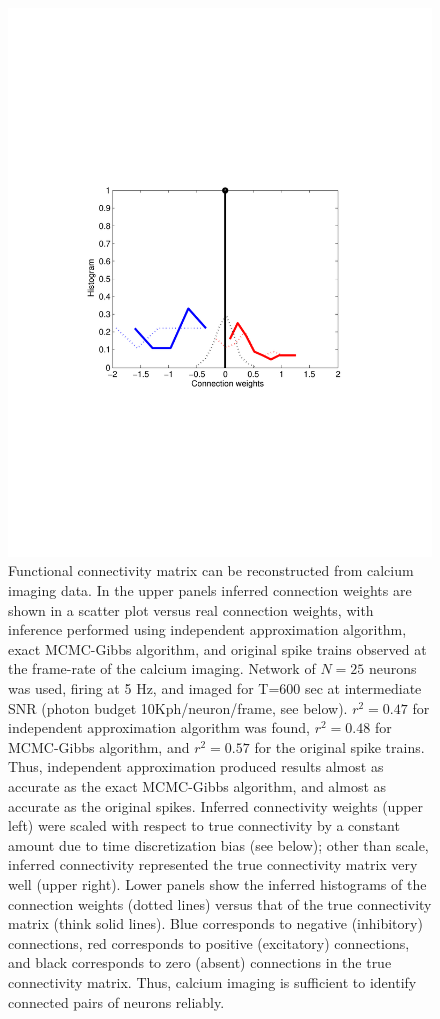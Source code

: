 \begin{figure}[h]
\begin{minipage}[c]{0.3\hsize}
\includegraphics[width=\hsize]{../figs/FigureA3_hist_orig}
\end{minipage}
\caption{Functional connectivity matrix can be reconstructed from calcium imaging data.
In the upper panels inferred connection weights are shown in a scatter plot versus real connection weights, with inference performed using independent approximation algorithm, exact MCMC-Gibbs algorithm, and original spike trains observed at the frame-rate of the calcium imaging. Network of $N=25$ neurons was used, firing at 5 Hz, and imaged for T=600 sec at intermediate SNR (photon budget 10Kph/neuron/frame, see below).
$r^2=0.47$ for independent approximation algorithm was found, $r^2=0.48$ for MCMC-Gibbs algorithm, and $r^2=0.57$ for the original spike trains. 
Thus, independent approximation produced results almost as accurate as the exact MCMC-Gibbs algorithm, and almost as accurate as the original spikes.
Inferred connectivity weights (upper left) were scaled with respect to true connectivity by a constant amount due to time discretization bias (see below); other than scale, inferred connectivity represented the true connectivity matrix very well (upper right).
Lower panels show the inferred histograms of the connection weights (dotted lines) versus that of the true connectivity matrix (think solid lines). Blue corresponds to negative (inhibitory) connections, red corresponds to positive (excitatory) connections, and black corresponds to zero (absent) connections in the true connectivity matrix.
Thus, calcium imaging is sufficient to identify connected pairs of neurons reliably.}
\label{fig:scatters}
\end{figure}


